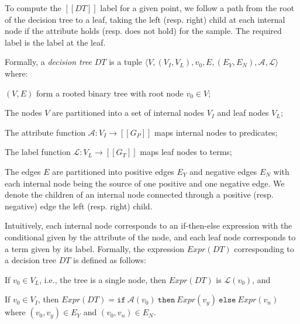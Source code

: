 \documentclass{llncs}
\newcommand\tuple[1]{\langle #1 \rangle}
\newcommand\Grammar{G}
\newcommand\sem[1]{[\![ #1 ]\!]}
\newcommand\ITE[3]{\mathtt{if}~#1~\mathtt{then}~#2~\mathtt{else}~#3}
\newcommand\DecisionTree{\mathit{DT}}
\newcommand\DTtoExpr[1]{\mathit{Expr}(#1)}
\newcommand\NodesInternal{V_I}
\newcommand\Nodes{V}
\newcommand\node{v}
\newcommand\NodesLeaf{V_L}
\newcommand\EdgesYes{E_Y}
\newcommand\EdgesNo{E_N}
\newcommand\Edges{E}
\newcommand\Attribute{\mathcal{A}}
\newcommand\Label{\mathcal{L}}
\begin{document}
To compute the $\sem{\DecisionTree}$ label for a given point, we follow
a path from the root of the decision tree to a leaf, taking the left
(resp. right) child at each internal node if the attribute holds (resp.
does not hold) for the sample.
The required label is the label at the leaf.

Formally, a {\em decision tree} $\DecisionTree$  is a tuple $\tuple{
\Nodes, (\NodesInternal, \NodesLeaf), \node_0, \Edges, (\EdgesYes,
\EdgesNo), \Attribute, \Label }$ where:
\begin{inparaenum}[(a)]
\item $(\Nodes, \Edges)$ form a rooted binary tree with root node
    $\node_0 \in \Nodes$;
\item The nodes $\Nodes$ are partitioned into a set of internal nodes
    $\NodesInternal$ and leaf nodes $\NodesLeaf$;
\item The attribute function $\Attribute : \NodesInternal \to
    \sem{\Grammar_P}$ maps internal nodes to predicates;
\item The label function $\Label : \NodesLeaf \to \sem{\Grammar_T}$ maps
    leaf nodes to terms;
\item The edges $\Edges$ are partitioned into positive edges $\EdgesYes$
  and negative edges $\EdgesNo$ with each internal node being the source
  of one positive and one negative edge.
  We denote the children of an internal node connected through a
  positive (resp. negative) edge the left (resp. right) child.
\end{inparaenum}

Intuitively, each internal node corresponds to an if-then-else
expression with the conditional given by the attribute of the node, and
each leaf node corresponds to a term given by its label.
Formally, the expression $\DTtoExpr{\DecisionTree}$ corresponding to a
decision tree $\DecisionTree$ is defined as follows:
\begin{inparaenum}[(a)]
\item If $\node_0 \in \NodesLeaf$, i.e., the tree is a single node, then
    $\DTtoExpr{\DecisionTree}$ is $\Label(\node_0)$, and
\item If $\node_0 \in \NodesInternal$, then $\DTtoExpr{\DecisionTree} =
  \ITE{\Attribute(\node_0)}{\DTtoExpr{\node_y}}{\DTtoExpr{\node_n}}$
  where $(\node_0, \node_y) \in \EdgesYes$ and $(\node_0, \node_n) \in \EdgesNo$.
\end{inparaenum}
\end{document}
